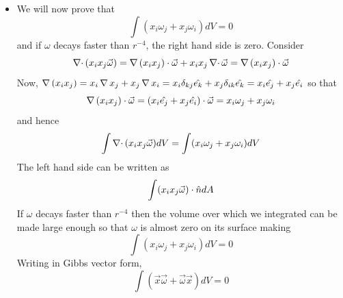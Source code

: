 \begin{itemize}
\item We will now prove that 
\[
\int(x_i\omega_j + x_j\omega_i)dV = 0
\]
and if $\omega$ decays faster than $r^{-4}$, the right hand side is zero. Consider
\[
\operatorname{\nabla\cdot}{(x_ix_j\vec{\omega})} = \operatorname{\nabla}{(x_ix_j)}\cdot\vec{\omega} + x_ix_j\operatorname{\nabla\cdot}{\vec{\omega}} = \operatorname{\nabla}{(x_ix_j)}\cdot\vec{\omega}
\]
Now, $\operatorname{\nabla}{(x_ix_j)} = x_i\operatorname{\nabla}{x_j} + x_j\operatorname{\nabla}{x_i} = x_i\delta_{kj}\hat{e_{k}} + x_j\delta_{ik}\hat{e_{k}} = x_i\hat{e_{j}} + x_j\hat{e_{i}}$ so that
\[
\operatorname{\nabla}{(x_ix_j)}\cdot\vec{\omega} = (x_i\hat{e_{j}} + x_j\hat{e_{i}})\cdot\vec{\omega} = x_i\omega_j + x_j\omega_i
\]
and hence
\[
\int\operatorname{\nabla\cdot}{(x_ix_j\vec{\omega})}dV = \int(x_i\omega_j + x_j\omega_i)dV
\]
The left hand side can be written as
\[
\int (x_i x_j \vec{\omega})\cdot\hat{n} dA
\]
If $\omega$ decays faster than $r^{-4}$ then the volume over which we integrated can be made large enough so that $\omega$ is almost zero on its surface making
\begin{equation}\label{c2s9e3}
\int(x_i\omega_j + x_j\omega_i)dV = 0
\end{equation}
Writing in Gibbs vector form,
\begin{equation}\label{c2s9e4}
\int(\vec{x}\vec{\omega} + \vec{\omega}\vec{x})dV = 0
\end{equation}


\end{itemize}
